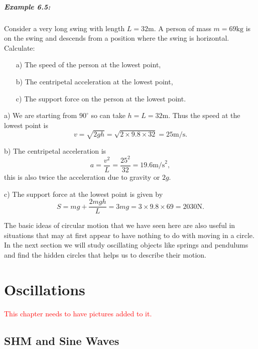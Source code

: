 \documentclass[a4paper,12pt]{book}
\begin{document}
\paragraph{Example 6.5:} Consider a very long swing with length $L=32\text{m}$. A person of mass $m=69\text{kg}$ is on the swing and descends from a position where the swing is horizontal. Calculate:
\begin{itemize}
\setlength{\itemsep}{-5pt}
    \item[a)] The speed of the person at the lowest point,
    \item[b)] The centripetal acceleration at the lowest point,
    \item[c)] The support force on the person at the lowest point.
\end{itemize} 

a) We are starting from $90^{\circ}$ so can take $h=L=32\text{m}$. Thus the speed at the lowest point is 
\begin{equation*}
v=\sqrt{2gh}=\sqrt{2\times 9.8\times 32}=25\text{m/s}.
\end{equation*}

b) The centripetal acceleration is 
\begin{equation*}
a=\frac{v^{2}}{L}=\frac{25^{2}}{32}=19.6\text{m/s}^{2},
\end{equation*}
this is also twice the acceleration due to gravity or $2g$.

c) The support force at the lowest point is given by 
\begin{equation*}
S=mg+\frac{2mgh}{L}=3mg=3\times 9.8\times 69=2030\text{N}.
\end{equation*}

The basic ideas of circular motion that we have seen here are also useful in situations that may at first appear to have nothing to do with moving in a circle. In the next section we will study oscillating objects like springs and pendulums and find the hidden circles that helps us to describe their motion.



\chapter{Oscillations}
\textcolor{red}{This chapter needs to have pictures added to it.}
\section{SHM and Sine Waves}
\end{document}
